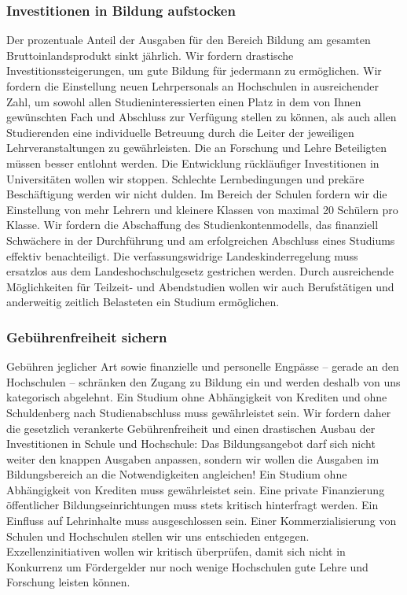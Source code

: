 \subsubsection{Investitionen in Bildung aufstocken}
\abstimmung
Der prozentuale Anteil der Ausgaben für den Bereich Bildung am gesamten Bruttoinlandsprodukt sinkt jährlich. Wir fordern drastische Investitionssteigerungen, um gute Bildung für jedermann zu ermöglichen. Wir fordern die Einstellung neuen Lehrpersonals an Hochschulen in ausreichender Zahl, um sowohl allen Studieninteressierten einen Platz in dem von Ihnen gewünschten Fach und Abschluss zur Verfügung stellen zu können, als auch allen Studierenden eine individuelle Betreuung durch die Leiter der jeweiligen Lehrveranstaltungen zu gewährleisten. Die an Forschung und Lehre Beteiligten müssen besser entlohnt werden. Die Entwicklung rückläufiger Investitionen in Universitäten wollen wir stoppen. Schlechte Lernbedingungen und prekäre Beschäftigung werden wir nicht dulden. Im Bereich der Schulen fordern wir die Einstellung von mehr Lehrern und kleinere Klassen von maximal 20 Schülern pro Klasse. Wir fordern die Abschaffung des Studienkontenmodells, das finanziell Schwächere in der Durchführung und am erfolgreichen Abschluss eines Studiums effektiv benachteiligt. Die verfassungswidrige Landeskinderregelung muss ersatzlos aus dem Landeshochschulgesetz gestrichen werden. Durch ausreichende Möglichkeiten für Teilzeit- und Abendstudien wollen wir auch Berufstätigen und anderweitig zeitlich Belasteten ein Studium ermöglichen.

\newpage
\subsubsection{Gebührenfreiheit sichern}
\abstimmung
Gebühren jeglicher Art sowie finanzielle und personelle Engpässe – gerade an den Hochschulen – schränken den Zugang zu Bildung ein und werden deshalb von uns kategorisch abgelehnt. Ein Studium ohne Abhängigkeit von Krediten und ohne Schuldenberg nach Studienabschluss muss gewährleistet sein. Wir fordern daher die gesetzlich verankerte Gebührenfreiheit und einen drastischen Ausbau der Investitionen in Schule und Hochschule: Das Bildungsangebot darf sich nicht weiter den knappen Ausgaben anpassen, sondern wir wollen die Ausgaben im Bildungsbereich an die Notwendigkeiten angleichen! Ein Studium ohne Abhängigkeit von Krediten muss gewährleistet sein. Eine private Finanzierung öffentlicher Bildungseinrichtungen muss stets kritisch hinterfragt werden. Ein Einfluss auf Lehrinhalte muss ausgeschlossen sein. Einer Kommerzialisierung von Schulen und Hochschulen stellen wir uns entschieden entgegen. Exzellenzinitiativen wollen wir kritisch überprüfen, damit sich nicht in Konkurrenz um Fördergelder nur noch wenige Hochschulen gute Lehre und Forschung leisten können.
 
